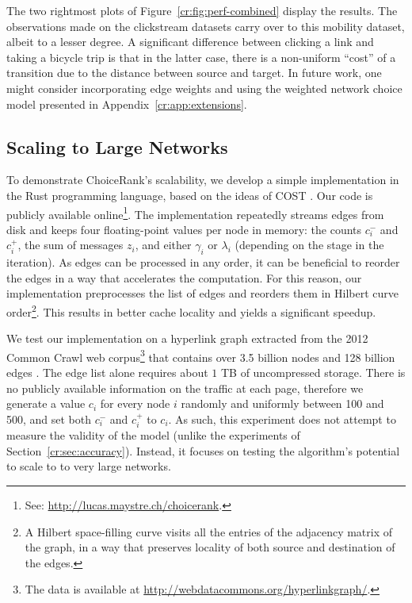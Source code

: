 The two rightmost plots of Figure~\ref{cr:fig:perf-combined} display the results.
The observations made on the clickstream datasets carry over to this mobility dataset, albeit to a lesser degree.
A significant difference between clicking a link and taking a bicycle trip is that in the latter case, there is a non-uniform ``cost'' of a transition due to the distance between source and target.
In future work, one might consider incorporating edge weights and using the weighted network choice model presented in Appendix~\ref{cr:app:extensions}.


\subsection{Scaling to Large Networks}

To demonstrate ChoiceRank's scalability, we develop a simple implementation in the Rust programming language, based on the ideas of COST \citep{mcsherry2015scalability}.
Our code is publicly available online\footnote{See: \url{http://lucas.maystre.ch/choicerank}.}.
The implementation repeatedly streams edges from disk and keeps four floating-point values per node in memory:
the counts $c^-_i$ and $c^+_i$, the sum of messages $z_i$, and either $\gamma_i$ or $\lambda_i$ (depending on the stage in the iteration).
As edges can be processed in any order, it can be beneficial to reorder the edges in a way that accelerates the computation.
For this reason, our implementation preprocesses the list of edges and reorders them in Hilbert curve order\footnote{A Hilbert space-filling curve visits all the entries of the adjacency matrix of the graph, in a way that preserves locality of both source and destination of the edges.}.
This results in better cache locality and yields a significant speedup.

We test our implementation on a hyperlink graph extracted from the 2012 Common Crawl web corpus\footnote{
The data is available at \url{http://webdatacommons.org/hyperlinkgraph/}.} that contains over \num{3.5} billion nodes and \num{128} billion edges \citep{meusel2014graph}.
The edge list alone requires about $1$ TB of uncompressed storage.
There is no publicly available information on the traffic at each page, therefore we generate a value $c_i$ for every node $i$ randomly and uniformly between \num{100} and \num{500}, and set both $c^-_i$ and $c^+_i$ to $c_i$.
As such, this experiment does not attempt to measure the validity of the model (unlike the experiments of Section~\ref{cr:sec:accuracy}).
Instead, it focuses on testing the algorithm's potential to scale to to very large networks.

